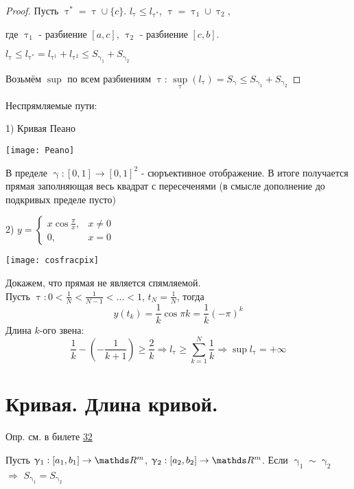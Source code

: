 \documentclass[11pt, fleqn]{article}
\begin{document}
\begin{Property}[3]
\begin{Property}[4]
\begin{Property}[2, аддитивность]
\begin{Proof}
\begin{proof}
    Пусть $\uptau^* = \uptau \cup \{c\}$. $l_\uptau \leqslant l_{\uptau^*}$, $\uptau = \uptau_1 \cup \uptau_2$, 
    
    где $\uptau_1$ - разбиение $[a,c]$, $\uptau_2$ - разбиение $[c,b]$.
    
    $l_\uptau \leqslant l_{\uptau^*} = l_{\uptau^1} + l_{\uptau^2} \leqslant S_{\upgamma_1} + S_{\upgamma_2}$
    
    Возьмём $\sup$ по всем разбиениям $\uptau$: $\sup\limits_{\uptau} (l_{\uptau}) = S_\upgamma \leqslant S_{\upgamma_1} + S_{\upgamma_2}$
\end{proof}

\begin{examples}
    Неспрямляемые пути:
    
    1) Кривая Пеано
    
    \texttt{[image: Peano]}
    
    В пределе $\upgamma: [0,1] \rightarrow [0,1]^2$ - сюръективное отображение. В итоге получается прямая заполняющая весь квадрат с пересеченями (в смысле дополнение до подкривых  пределе пусто)
    
    2) $y = 
    \begin{cases}
       x \cos \frac{\pi}{x}, & x \neq 0\\
       0, & x = 0
     \end{cases}$
    
    \texttt{[image: cosfracpix]}
    
    Докажем, что прямая не является спямляемой. 
    \\
    Пусть $\uptau: 0 < \frac{1}{N} < \frac{1}{N -1} < ... < 1$, $t_N = \frac{1}{N}$, тогда 
    \[y(t_k) = \frac{1}{k} \cos \pi k = \frac{1}{k} (-\pi)^k\]
    Длина $k$-ого звена: 
    \[\frac{1}{k} - (-\frac{1}{k+1}) \geqslant \frac{2}{k} \Rightarrow l_\uptau \geqslant \sum\limits_{k=1}^N  \frac{1}{k}\Rightarrow \sup l_\uptau = +\infty\]
\end{examples}

\newpage
\section{Кривая. Длина кривой.}

Опр. см. в билете \hyperlink{q32}{32}
\begin{theorem} 
    Пусть $\upgamma_1: [a_1,b_1] \rightarrow \R^m$, $\upgamma_2: [a_2,b_2] \rightarrow
    \R^m$. Если $\upgamma_1 \sim \upgamma_2$ $\Rightarrow$ $S_{\upgamma_1} = S_{\upgamma_2}$
\end{theorem}


\end{Proof}
\end{Property}
\end{Property}
\end{Property}
\end{document}
